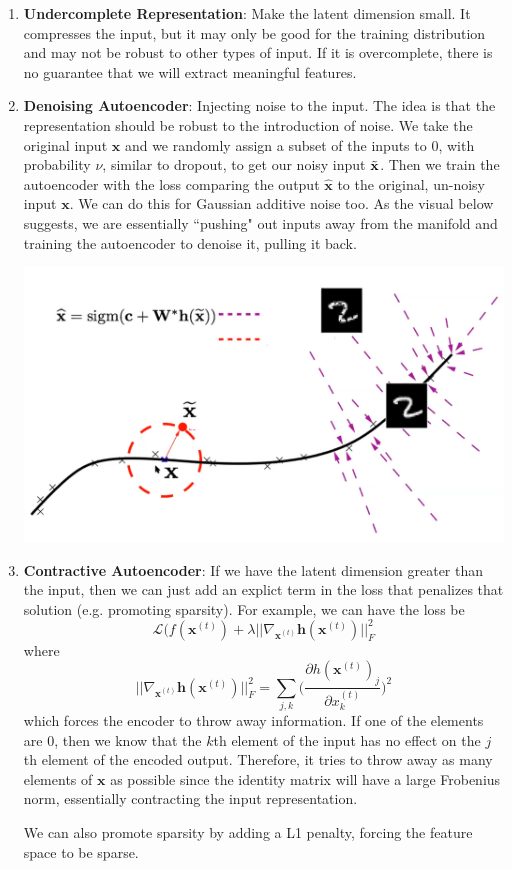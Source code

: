     \begin{enumerate}
      \item \textbf{Undercomplete Representation}: Make the latent dimension small. It compresses the input, but it may only be good for the training distribution and may not be robust to other types of input. If it is overcomplete, there is no guarantee that we will extract meaningful features. 

      \item \textbf{Denoising Autoencoder}: Injecting noise to the input. The idea is that the representation should be robust to the introduction of noise. We take the original input $\mathbf{x}$ and we randomly assign a subset of the inputs to $0$, with probability $\nu$, similar to dropout, to get our noisy input $\Tilde{\mathbf{x}}$. Then we train the autoencoder with the loss comparing the output $\hat{\mathbf{x}}$ to the original, un-noisy input $\mathbf{x}$. We can do this for Gaussian additive noise too. As the visual below suggests, we are essentially ``pushing" out inputs away from the manifold and training the autoencoder to denoise it, pulling it back. 

        \begin{center}
            \includegraphics[scale=0.3]{img/05_Encoder_Decoder/denoising_autoencoder.png}
        \end{center}
    
      \item \textbf{Contractive Autoencoder}: If we have the latent dimension greater than the input, then we can just add an explict term in the loss that penalizes that solution (e.g. promoting sparsity). For example, we can have the loss be 
      \[\mathcal{L}(f(\mathbf{x}^{(t)}) + \lambda || \nabla_{\mathbf{x}^{(t)}} \mathbf{h}(\mathbf{x}^{(t)})||^2_F\]
      where 
      \[||\nabla_{\mathbf{x}^{(t)}} \mathbf{h}(\mathbf{x}^{(t)})||_F^2 = \sum_{j, k} \bigg(\frac{\partial h(\mathbf{x}^{(t)})_j}{\partial x_k^{(t)}} \bigg)^2\]
      which forces the encoder to throw away information. If one of the elements are $0$, then we know that the $k$th element of the input has no effect on the $j$th element of the encoded output. Therefore, it tries to throw away as many elements of $\mathbf{x}$ as possible since the identity matrix will have a large Frobenius norm, essentially contracting the input representation.  

      We can also promote sparsity by adding a L1 penalty, forcing the feature space to be sparse. 
    \end{enumerate}

